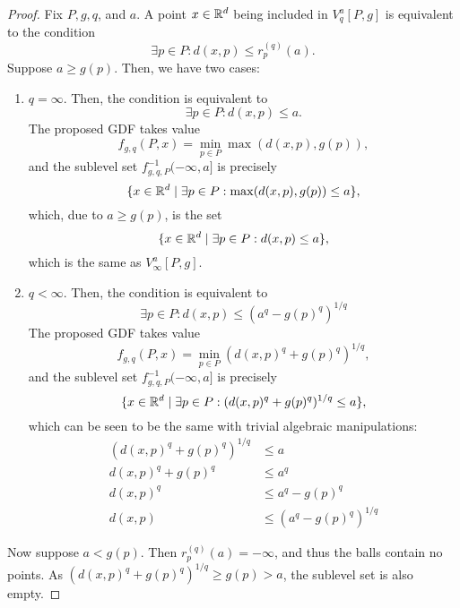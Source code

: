 \begin{proof}
    Fix $P, g, q$, and $a$. A point $x \in \mathbb{R}^d$ being included in $V^a_q[P, g]$
    is equivalent to the condition
    \begin{equation}
        \exists p \in P : d(x, p) \leq r_p^{(q)}(a).
    \end{equation}
    Suppose $a \geq g(p)$. Then, we have two cases:
    \begin{enumerate}
        \item $q = \infty$. Then, the condition is equivalent to
            \begin{equation}
                \exists p \in P : d(x, p) \leq a.
            \end{equation}
            The proposed GDF takes value
            \begin{equation}
                f_{g, q}(P, x) = \min_{p \in P} \max(d(x, p), g(p)),
            \end{equation}
            and the sublevel set $f^{-1}_{g, q, P}(-\infty, a]$ is precisely
            \begin{equation}
                \{x \in \mathbb{R}^d \mid \exists p \in P : \max(d(x, p), g(p)) \leq a\},
            \end{equation}
            which, due to $a \geq g(p)$, is the set
            \begin{equation}
                \{x \in \mathbb{R}^d \mid \exists p \in P : d(x, p) \leq a\},
            \end{equation}
            which is the same as $V^a_\infty[P, g]$.
        \item $q < \infty$. Then, the condition is equivalent to
            \begin{equation}
                \exists p \in P : d(x, p) \leq (a^q - g(p)^q)^{1/q}
            \end{equation}
            The proposed GDF takes value
            \begin{equation}
                f_{g, q}(P, x) = \min_{p \in P} (d(x, p)^q + g(p)^q)^{1/q},
            \end{equation}
            and the sublevel set $f^{-1}_{g, q, P}(-\infty, a]$ is precisely
            \begin{equation}
                \{x \in \mathbb{R}^d \mid \exists p \in P : (d(x, p)^q + g(p)^q)^{1/q} \leq a\},
            \end{equation}
            which can be seen to be the same with trivial algebraic manipulations:
            \begin{align}
                (d(x, p)^q + g(p)^q)^{1/q} & \leq a \\
                d(x, p)^q + g(p)^q & \leq a^q \\
                d(x, p)^q & \leq a^q - g(p)^q\\
                d(x, p) & \leq (a^q - g(p)^q)^{1 / q}
            \end{align}
    \end{enumerate}

    Now suppose $a < g(p)$. Then $r_p^{(q)}(a) = - \infty$, and thus the balls
    contain no points. As $(d(x, p)^q + g(p)^q)^{1/q} \geq g(p) > a$, the sublevel
    set is also empty.
\end{proof}

